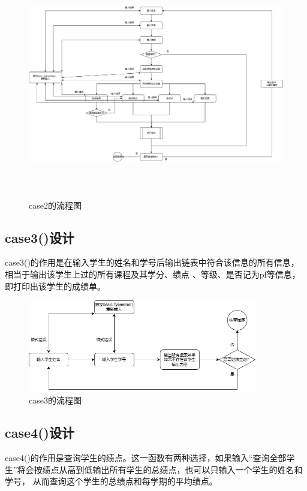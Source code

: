 \documentclass[fontset=windows]{article}
\begin{document}
\begin{figure}[h]
	\begin{center}
		\vspace{-2cm}
		\includegraphics[height = 10cm]{case2.png}
		\vspace{1cm}
		\caption{case2的流程图}
	\end{center}
\end{figure}
\subsection{case3()设计}
case3()的作用是在输入学生的姓名和学号后输出链表中符合该信息的所有信息，相当于输出该学生上过的所有课程及其学分、绩点
、等级、是否记为pf等信息，即打印出该学生的成绩单。

\begin{figure}[h]
	\begin{center}
		\vspace{0.3cm}
		\includegraphics[width = 10cm]{case3.png}
		\vspace{1cm}
		\caption{case3的流程图}
	\end{center}
\end{figure}
\subsection{case4()设计}
case4()的作用是查询学生的绩点。这一函数有两种选择，如果输入“查询全部学生”将会按绩点从高到低输出所有学生的总绩点，也可以只输入一个学生的姓名和学号，
从而查询这个学生的总绩点和每学期的平均绩点。
\end{document}

